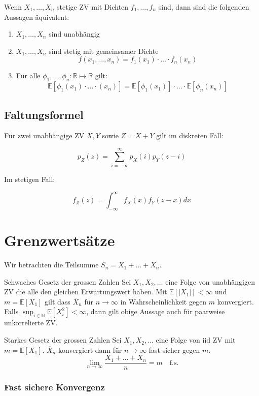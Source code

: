 \documentclass[a4paper,10pt]{article}
\def\R{\mathbb{R}}
\def\E{\mathbb{E}}
\begin{document}
Wenn \(X_1, \ldots, X_n\) stetige ZV mit Dichten \(f_1, \ldots, f_n\) sind, dann sind die folgenden Aussagen äquivalent:
\begin{enumerate}
	\item \(X_1, \ldots, X_n\) sind unabhängig
	\item \(X_1, \ldots, X_n\) sind stetig mit gemeinsamer Dichte
	      \[f(x_1, \ldots, x_n) = f_1(x_1) \cdot \ldots \cdot f_n(x_n)\]
	\item Für alle \(\phi_1, \ldots, \phi_n: \R \mapsto \R\) gilt:
	      \[\E[\phi_1 (x_1)\cdot \ldots\cdot (x_n)] = \E[\phi_1(x_1)] \cdot \ldots \cdot \E[\phi_n(x_n)]\]
\end{enumerate}

\subsection{Faltungsformel}

Für zwei unabhängige ZV $X, Y$ sowie $Z = X + Y$ gilt im diskreten Fall:

$$
	p_Z(z) = \sum_{i = -\infty}^\infty p_X(i) p_Y(z - i)
$$

Im stetigen Fall:

$$
	f_Z(z) = \int_{-\infty}^\infty f_X(x) f_Y(z - x) dx
$$

\section{Grenzwertsätze}
 Wir betrachten die Teilsumme \(S_n = X_1 + \ldots + X_n\).
\begin{mainbox}{Schwaches Gesetz der grossen Zahlen}
	Sei \(X_1, X_2, \ldots\) eine Folge von unabhängigen ZV die alle den gleichen Erwartungswert haben. Mit \(\E[|X_1|] < \infty\) und \(m = \E[X_1]\) gilt dass $\overline{X}_n$ für $n \to \infty$ in Wahrscheinlichkeit gegen $m$ konvergiert. Falls $\sup_{i \in \mathbb{N}} \E[X_i^2] < \infty$, dann gilt obige Aussage auch für paarweise unkorrelierte ZV.
\end{mainbox}

\begin{mainbox}{Starkes Gesetz der grossen Zahlen}
	Sei $X_1, X_2, \ldots$ eine Folge von iid ZV mit $m = \E[X_1]$. $\overline{X}_n$ konvergiert dann für $n \to \infty$ fast sicher gegen $m$.
	$$
	\lim_{n\to \infty} \frac{X_1 + \ldots + X_n}{n} = m \quad \text{f.s.}
	$$
\end{mainbox}

\subsubsection*{Fast sichere Konvergenz}
\end{document}
